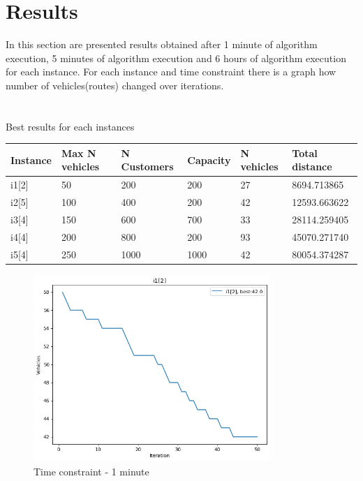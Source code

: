 \documentclass{article}
\begin{document}
\section{Results}
In this section are presented results obtained after 1 minute of algorithm execution, 5 minutes of algorithm execution and 6 hours of algorithm execution for each instance. For each instance and time constraint there is a graph how number of vehicles(routes) changed over iterations.
\\
\\
\\
Best results for each instances
\begin{center}
\begin{tabular}{ | m{4em} | m{8em} | m{7em} | m{4em} || m{7em}| m{7em} | } 
  \hline
  Instance & Max N vehicles & N Customers & Capacity & N vehicles & Total distance \\ 
  \hline
  i1[2] & 50 & 200 & 200 & 27 & 8694.713865 \\ 
  \hline
  i2[5] & 100 & 400 & 200  & 42 & 12593.663622 \\ 
  \hline
  i3[4] & 150 & 600 & 700  & 33 & 28114.259405 \\ 
  \hline
  i4[4] & 200 & 800 & 200  & 93 & 45070.271740 \\ 
  \hline
  i5[4] & 250 & 1000 & 1000  & 42 & 80054.374287 \\ 
  \hline
\end{tabular}
\end{center}

\begin{figure}
\centering
\includegraphics[width=0.8\textwidth]{i1[2]_1_vehicles.png}
\caption{\label{fig:i1[2]_1_vehicles}Time constraint - 1 minute}
\end{figure}
\end{document}
